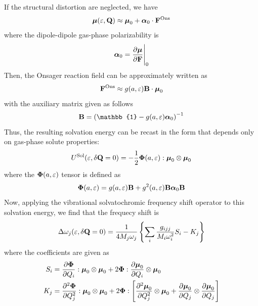 \documentclass[a4paper,titlepage,twoside,fleqn,12pt]{book}
\newcommand{\BM}[1]{\ensuremath{\mbox{\boldmath${#1}$}}}
\newcommand{\fderiv}[2]{\ensuremath{
\frac{\partial #1}{\partial #2}}}
\newcommand{\sderiv}[2]{\ensuremath{
\frac{\partial^2 #1}{\partial #2^2}
}}
\begin{document}
\begin{refsection}
If the structural distortion are neglected, we have
%
\begin{equation}
 {\BM \mu}(\varepsilon, {\bf Q}) \approx 
 {\BM \mu}_0 + {\BM \alpha}_0  \cdot {\bf F}^{\rm Ons}
\end{equation}
%
where the dipole\hyp{}dipole gas\hyp{}phase polarizability is
%
\begin{equation}
{\BM \alpha}_0  = \fderiv{{\BM \mu}}{\bf F}\Bigg|_{0}
\end{equation}
%
Then, the Onsager reaction field can be approximately written as
%
\begin{equation}
{\bf F}^{\rm Ons} \approx g(a,\varepsilon) {\bf B} \cdot {\BM \mu}_0
\end{equation}
%
with the auxiliary matrix given as follows
%
\begin{equation}
{\bf B} = \left( \mathbb{1} - g(a,\varepsilon){\BM \alpha}_0 \right)^{-1}
\end{equation}
%
Thus, the resulting solvation energy can be recast in the form
that depends only on gas\hyp{}phase solute properties:
%
\begin{equation} \label{e:ons-e-sol-init}
U^{\rm Sol}(\varepsilon, \delta{\bf Q}=0) = -\frac{1}{2} {\BM \Phi}(a, \varepsilon) : {\BM \mu}_0 \otimes {\BM \mu}_0
\end{equation}
%
where the ${\BM \Phi}(a, \varepsilon)$ tensor is defined as
%
\begin{equation}
{\BM \Phi}(a, \varepsilon) = g(a,\varepsilon) {\bf B} + g^2(a,\varepsilon) {\bf B} {\BM \alpha}_0 {\bf B}
\end{equation}
%
Now, applying the vibrational solvatochromic frequency shift
operator to this solvation energy,
we find that the frequecy shift is
%
\begin{equation} \label{e:dw-ons-working-form}
\Delta\omega_j(\varepsilon, \delta{\bf Q}=0) = \frac{1}{4M_j\omega_j}
\left\{ \sum_i \frac{g_{ijj}}{M_i\omega_i^2}S_i - K_j \right\}
\end{equation}
%
where the coefficients are given as
%
\begin{subequations}
 \begin{align}
  S_i &= \fderiv{{\BM \Phi}}{Q_i} : {\BM \mu}_0 \otimes {\BM \mu}_0 
           + 2{\BM \Phi} : \fderiv{{\BM \mu}_0}{Q_i} \otimes {\BM \mu}_0 \label{e:ons-si-init}\\
  K_j &= \sderiv{{\BM \Phi}}{Q_j} : {\BM \mu}_0 \otimes {\BM \mu}_0
           + 2{\BM \Phi} : \left[ \sderiv{{\BM \mu}_0}{Q_j} \otimes {\BM \mu}_0 
           +  \fderiv{{\BM \mu}_0}{Q_j} \otimes \fderiv{{\BM \mu}_0}{Q_j} \right] 

\end{align}
\end{subequations}
\end{refsection}
\end{document}

